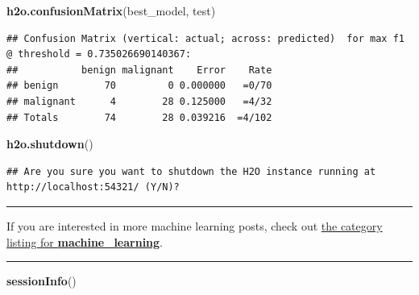 \documentclass[]{article}
\newenvironment{Shaded}{\begin{snugshade}}{\end{snugshade}}
\newcommand{\KeywordTok}[1]{\textcolor[rgb]{0.13,0.29,0.53}{\textbf{{#1}}}}
\newcommand{\NormalTok}[1]{{#1}}
\begin{document}
\begin{Shaded}
\begin{Highlighting}[]
\KeywordTok{h2o.confusionMatrix}\NormalTok{(best_model, test)}
\end{Highlighting}
\end{Shaded}

\begin{verbatim}
## Confusion Matrix (vertical: actual; across: predicted)  for max f1 @ threshold = 0.735026690140367:
##           benign malignant    Error    Rate
## benign        70         0 0.000000   =0/70
## malignant      4        28 0.125000   =4/32
## Totals        74        28 0.039216  =4/102
\end{verbatim}

\begin{Shaded}
\begin{Highlighting}[]
\KeywordTok{h2o.shutdown}\NormalTok{()}
\end{Highlighting}
\end{Shaded}

\begin{verbatim}
## Are you sure you want to shutdown the H2O instance running at http://localhost:54321/ (Y/N)?
\end{verbatim}

\begin{center}\rule{0.5\linewidth}{\linethickness}\end{center}

If you are interested in more machine learning posts, check out
\href{https://shiring.github.io/categories.html\#machine_learning-ref}{the
category listing for \textbf{machine\_learning}}.

\begin{center}\rule{0.5\linewidth}{\linethickness}\end{center}

\begin{Shaded}
\begin{Highlighting}[]
\KeywordTok{sessionInfo}\NormalTok{()}
\end{Highlighting}
\end{Shaded}
\end{document}

